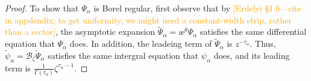\documentclass{article}
\newcommand{\series}[1]{\tilde{#1}}
\newcommand{\borel}{\mathcal{B}}
\newcommand{\aexp}{\text{\ae}}
\theoremstyle{definition}
\theoremstyle{plain}
\newtheorem{theorem}{Theorem}[section]
\begin{document}
{\begin{proof}
To show that $\Psi_\alpha$ is Borel regular, first observe that by \textcolor{orange}{[Erdelyi \S 1.6---cite in appdendix; to get uniformity, we might need a constant-width strip, rather than a sector]}, the asymptotic expansion $\series{\Psi}_\alpha = \aexp^\theta \Psi_\alpha$ satisfies the same differential equation that $\Psi_\alpha$ does. In addition, the leadeing term of $\series{\Psi}_\alpha$ is $z^{-\tau_\alpha}$. Thus, $\series{\psi}_\alpha = \borel_\zeta \series{\Psi}_\alpha$ satisfies the same intergral equation that $\psi_\alpha$ does, and its leading term is $\frac{1}{\Gamma(\tau_\alpha)} \zeta^{\tau_\alpha - 1}$.
\end{proof}
\color{black}

%

\color{black}
}
\end{document}
